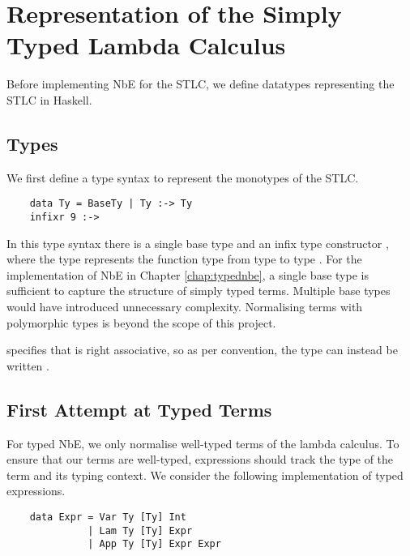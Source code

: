 \chapter{Representation of the Simply Typed Lambda Calculus}
\label{chap:typedlamadacalculus}


Before implementing NbE for the STLC, we define datatypes representing the STLC in Haskell. 

\section{Types}

We first define a type syntax  to represent the monotypes of the STLC. 

\begin{lstlisting}
    data Ty = BaseTy | Ty :-> Ty 
    infixr 9 :->
\end{lstlisting}

In this type syntax there is a single base type  and an infix type constructor \code{:->}, where the type  represents the function type from type  to type . For the implementation of NbE in Chapter \ref{chap:typednbe}, a single base type is sufficient to capture the structure of simply typed terms. Multiple base types would have introduced unnecessary complexity.
Normalising terms with polymorphic types is beyond the scope of this project.
 
 specifies that \code{:->} is right associative, so as per convention, the type  can instead be written .

\section{First Attempt at Typed Terms}

For typed NbE, we only normalise well-typed terms of the lambda calculus. To ensure that our terms are well-typed, expressions should track the type of the term and its typing context. We consider the following implementation of typed expressions.

\begin{lstlisting}
    data Expr = Var Ty [Ty] Int
              | Lam Ty [Ty] Expr
              | App Ty [Ty] Expr Expr
\end{lstlisting}

